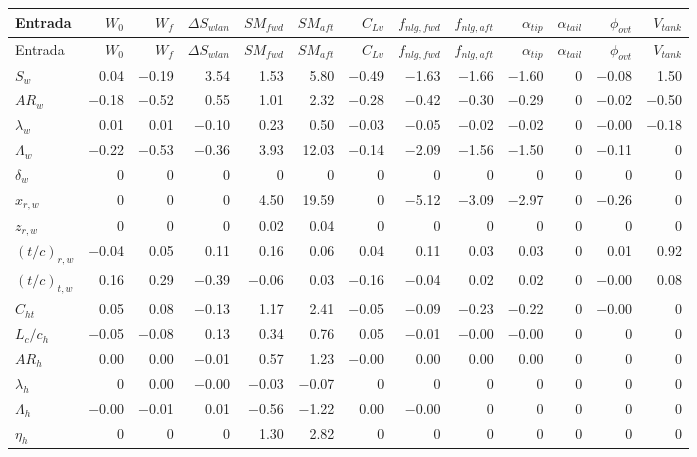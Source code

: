 \begin{longtable}{l|rrrrrrrrrrrr}
\toprule
Entrada & $W_0$ & $W_f$ & $\Delta S_{wlan}$ & $SM_{fwd}$ & $SM_{aft}$ & $C_{Lv}$ & $f_{nlg,fwd}$ & $f_{nlg,aft}$ & $\alpha_{tip}$ & $\alpha_{tail}$ & $\phi_{ovt}$ & $V_{tank}$ \\
\midrule
\endfirsthead
\toprule
Entrada & $W_0$ & $W_f$ & $\Delta S_{wlan}$ & $SM_{fwd}$ & $SM_{aft}$ & $C_{Lv}$ & $f_{nlg,fwd}$ & $f_{nlg,aft}$ & $\alpha_{tip}$ & $\alpha_{tail}$ & $\phi_{ovt}$ & $V_{tank}$ \\
\midrule
\endhead
$S_w$ & 0.04 & $-$0.19 & 3.54 & 1.53 & 5.80 & $-$0.49 & $-$1.63 & $-$1.66 & $-$1.60 & 0 & $-$0.08 & 1.50 \\
$AR_w$ & $-$0.18 & $-$0.52 & 0.55 & 1.01 & 2.32 & $-$0.28 & $-$0.42 & $-$0.30 & $-$0.29 & 0 & $-$0.02 & $-$0.50 \\
$\lambda_w$ & 0.01 & 0.01 & $-$0.10 & 0.23 & 0.50 & $-$0.03 & $-$0.05 & $-$0.02 & $-$0.02 & 0 & $-$0.00 & $-$0.18 \\
$\Lambda_w$ & $-$0.22 & $-$0.53 & $-$0.36 & 3.93 & 12.03 & $-$0.14 & $-$2.09 & $-$1.56 & $-$1.50 & 0 & $-$0.11 & 0 \\
$\delta_w$ & 0 & 0 & 0 & 0 & 0 & 0 & 0 & 0 & 0 & 0 & 0 & 0 \\
$x_{r,w}$ & 0 & 0 & 0 & 4.50 & 19.59 & 0 & $-$5.12 & $-$3.09 & $-$2.97 & 0 & $-$0.26 & 0 \\
$z_{r,w}$ & 0 & 0 & 0 & 0.02 & 0.04 & 0 & 0 & 0 & 0 & 0 & 0 & 0 \\
$(t/c)_{r,w}$ & $-$0.04 & 0.05 & 0.11 & 0.16 & 0.06 & 0.04 & 0.11 & 0.03 & 0.03 & 0 & 0.01 & 0.92 \\
$(t/c)_{t,w}$ & 0.16 & 0.29 & $-$0.39 & $-$0.06 & 0.03 & $-$0.16 & $-$0.04 & 0.02 & 0.02 & 0 & $-$0.00 & 0.08 \\
$C_{ht}$ & 0.05 & 0.08 & $-$0.13 & 1.17 & 2.41 & $-$0.05 & $-$0.09 & $-$0.23 & $-$0.22 & 0 & $-$0.00 & 0 \\
$L_c/c_h$ & $-$0.05 & $-$0.08 & 0.13 & 0.34 & 0.76 & 0.05 & $-$0.01 & $-$0.00 & $-$0.00 & 0 & 0 & 0 \\
$AR_h$ & 0.00 & 0.00 & $-$0.01 & 0.57 & 1.23 & $-$0.00 & 0.00 & 0.00 & 0.00 & 0 & 0 & 0 \\
$\lambda_h$ & 0 & 0.00 & $-$0.00 & $-$0.03 & $-$0.07 & 0 & 0 & 0 & 0 & 0 & 0 & 0 \\
$\Lambda_h$ & $-$0.00 & $-$0.01 & 0.01 & $-$0.56 & $-$1.22 & 0.00 & $-$0.00 & 0 & 0 & 0 & 0 & 0 \\
$\eta_h$ & 0 & 0 & 0 & 1.30 & 2.82 & 0 & 0 & 0 & 0 & 0 & 0 & 0 \\

\end{longtable}
